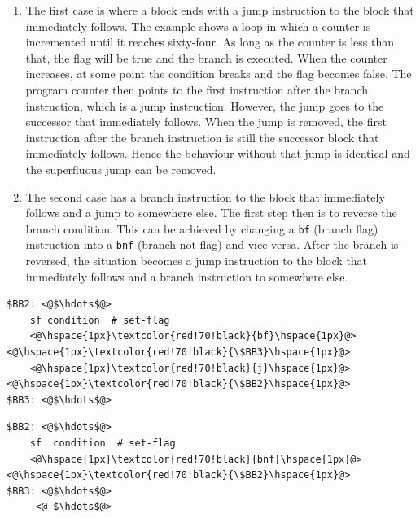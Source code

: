 \begin{enumerate}
  \item The first case is where a block ends with a jump instruction to the block that immediately follows. The example shows a loop in which a counter is incremented until it reaches sixty-four. As long as the counter is less than that, the flag will be true and the branch is executed. When the counter increases, at some point the condition breaks and the flag becomes false. The program counter then points to the first instruction after the branch instruction, which is a jump instruction. However, the jump goes to the successor that immediately follows. When the jump is removed, the first instruction after the branch instruction is still the successor block that immediately follows. Hence the behaviour without that jump is identical and the superfluous jump can be removed.
  \item The second case has a branch instruction to the block that immediately follows and a jump to somewhere else. The first step then is to reverse the branch condition. This can be achieved by changing a \texttt{bf} (branch flag) instruction into a \texttt{bnf} (branch not flag) and vice versa. After the branch is reversed, the situation becomes a jump instruction to the block that immediately follows and a branch instruction to somewhere else. 
\end{enumerate}

\label{lst:br_opt_2}
\begin{center}
\hspace{2px}\begin{minipage}{.475\textwidth}
\begin{lstlisting}[frame=tlrb]
$BB2: <@$\hdots$@>
    sf condition  # set-flag
    <@\hspace{1px}\textcolor{red!70!black}{bf}\hspace{1px}@> <@\hspace{1px}\textcolor{red!70!black}{\$BB3}\hspace{1px}@>
    <@\hspace{1px}\textcolor{red!70!black}{j}\hspace{1px}@>  <@\hspace{1px}\textcolor{red!70!black}{\$BB2}\hspace{1px}@>
$BB3: <@$\hdots$@>
\end{lstlisting}
\end{minipage}\hfill
\begin{minipage}{.475\textwidth}
\begin{lstlisting}[frame=tlrb]
$BB2: <@$\hdots$@>
    sf  condition  # set-flag
    <@\hspace{1px}\textcolor{red!70!black}{bnf}\hspace{1px}@> <@\hspace{1px}\textcolor{red!70!black}{\$BB2}\hspace{1px}@>
$BB3: <@$\hdots$@>
     <@ $\hdots$@>
\end{lstlisting}
\end{minipage}
\end{center}

